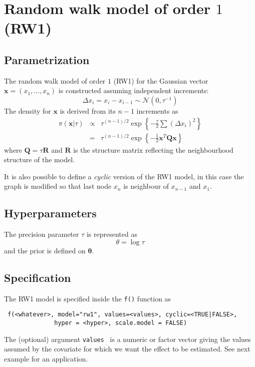 \documentclass[a4paper,11pt]{article}
\begin{document}
\section*{Random walk model of order $1$ (RW1)}

\subsection*{Parametrization}

The random walk model of order $1$ (RW1) for the Gaussian vector
$\mathbf{x}=(x_1,\dots,x_n)$ is constructed assuming independent
increments:
\[
\Delta x_i = x_i-x_{i-1}\sim\mathcal{N}(0,\tau^{-1})
\]
The density for $\mathbf{x}$ is derived from its $n-1$ increments as
\begin{eqnarray*}
    \pi(\mathbf{x}|\tau) &\propto& \tau^{(n-1)/2}
    \exp\left\{-\frac{\tau}{2}\sum (\Delta x_i)^2\right\}\\
    & = &\tau^{(n-1)/2}\exp\left\{-\frac{1}{2}
      \mathbf{x}^T\mathbf{Q}\mathbf{x} \right\}
\end{eqnarray*}
where $\mathbf{Q}=\tau\mathbf{R}$ and $\mathbf{R}$ is the structure
matrix reflecting the neighbourhood structure of the model.

It is also possible to define a {\it cyclic} version of the RW1 model,
in this case the graph is modified so that last node $x_n$ is
neighbour of $x_{n-1}$ and $x_1$.
\subsection*{Hyperparameters}

The precision parameter $\tau$ is represented as
\begin{displaymath}
    \theta =\log \tau
\end{displaymath}
and the prior is defined on $\mathbf{\theta}$.

\subsection*{Specification}

The RW1 model is specified inside the {\tt f()} function as
\begin{verbatim}
 f(<whatever>, model="rw1", values=<values>, cyclic=<TRUE|FALSE>,
              hyper = <hyper>, scale.model = FALSE)
\end{verbatim}
The (optional) argument {\tt values } is a numeric or factor vector
giving the values assumed by the covariate for which we want the
effect to be estimated. See next example for an application.
 
\end{document}
